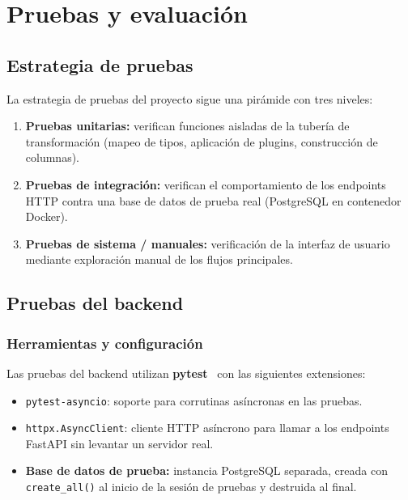 \chapter{Pruebas y evaluación}
\label{ch:pruebas}

\section{Estrategia de pruebas}
\label{sec:estrategia-pruebas}

La estrategia de pruebas del proyecto sigue una pirámide con tres niveles:

\begin{enumerate}
  \item \textbf{Pruebas unitarias:} verifican funciones aisladas de la tubería de
    transformación (mapeo de tipos, aplicación de plugins, construcción de columnas).
  \item \textbf{Pruebas de integración:} verifican el comportamiento de los endpoints
    HTTP contra una base de datos de prueba real (PostgreSQL en contenedor Docker).
  \item \textbf{Pruebas de sistema / manuales:} verificación de la interfaz de usuario
    mediante exploración manual de los flujos principales.
\end{enumerate}

\section{Pruebas del backend}
\label{sec:pruebas-backend}

\subsection{Herramientas y configuración}
\label{subsec:herramientas-test}

Las pruebas del backend utilizan \textbf{pytest}~\cite{pytest} con las siguientes
extensiones:

\begin{itemize}
  \item \texttt{pytest-asyncio}: soporte para corrutinas asíncronas en las pruebas.
  \item \texttt{httpx.AsyncClient}: cliente HTTP asíncrono para llamar a los endpoints
    FastAPI sin levantar un servidor real.
  \item \textbf{Base de datos de prueba:} instancia PostgreSQL separada, creada con
    \texttt{create\_all()} al inicio de la sesión de pruebas y destruida al final.
\end{itemize}

